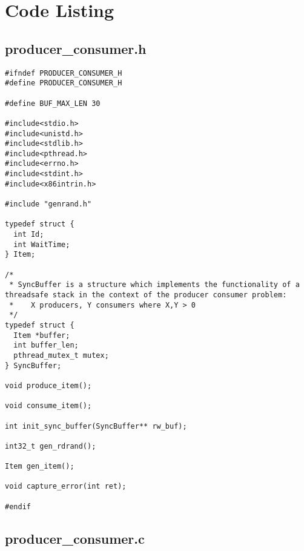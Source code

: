 \documentclass[letterpaper,10pt]{article}
\begin{document}
\section{Code Listing}
\subsection{producer\_consumer.h}

\begin{lstlisting}
#ifndef PRODUCER_CONSUMER_H
#define PRODUCER_CONSUMER_H

#define BUF_MAX_LEN 30

#include<stdio.h>
#include<unistd.h>
#include<stdlib.h>
#include<pthread.h>
#include<errno.h>
#include<stdint.h>
#include<x86intrin.h>

#include "genrand.h"

typedef struct {
  int Id;
  int WaitTime;
} Item;

/*
 * SyncBuffer is a structure which implements the functionality of a threadsafe stack in the context of the producer consumer problem:
 *    X producers, Y consumers where X,Y > 0
 */
typedef struct {
  Item *buffer;
  int buffer_len;
  pthread_mutex_t mutex;
} SyncBuffer;

void produce_item();

void consume_item();

int init_sync_buffer(SyncBuffer** rw_buf);

int32_t gen_rdrand();

Item gen_item();

void capture_error(int ret);

#endif

\end{lstlisting}
\newpage

\subsection{producer\_consumer.c}
\end{document}

